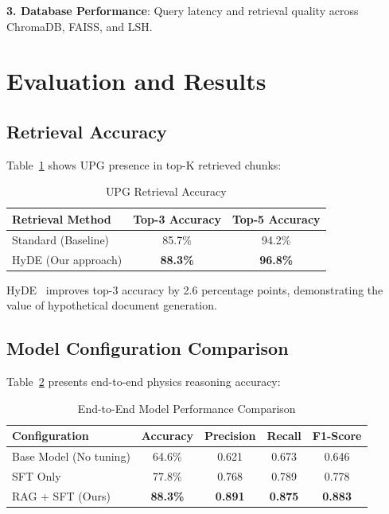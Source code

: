 \documentclass[11pt,a4paper]{article}
\begin{document}
\textbf{3. Database Performance}: Query latency and retrieval quality across ChromaDB, FAISS, and LSH.

\section{Evaluation and Results}

\subsection{Retrieval Accuracy}

Table~\ref{tab:retrieval_accuracy} shows UPG presence in top-K retrieved chunks:

\begin{table}[H]
\centering
\begin{tabular}{lcc}
\toprule
\textbf{Retrieval Method} & \textbf{Top-3 Accuracy} & \textbf{Top-5 Accuracy} \\
\midrule
Standard (Baseline) & 85.7\% & 94.2\% \\
HyDE (Our approach) & \textbf{88.3\%} & \textbf{96.8\%} \\
\bottomrule
\end{tabular}
\caption{UPG Retrieval Accuracy}
\label{tab:retrieval_accuracy}
\end{table}

HyDE~\cite{gao2022precise} improves top-3 accuracy by 2.6 percentage points, demonstrating the value of hypothetical document generation.

\subsection{Model Configuration Comparison}

Table~\ref{tab:model_comparison} presents end-to-end physics reasoning accuracy:

\begin{table}[H]
\centering
\begin{tabular}{lcccc}
\toprule
\textbf{Configuration} & \textbf{Accuracy} & \textbf{Precision} & \textbf{Recall} & \textbf{F1-Score} \\
\midrule
Base Model (No tuning) & 64.6\% & 0.621 & 0.673 & 0.646 \\
SFT Only & 77.8\% & 0.768 & 0.789 & 0.778 \\
RAG + SFT (Ours) & \textbf{88.3\%} & \textbf{0.891} & \textbf{0.875} & \textbf{0.883} \\
\bottomrule
\end{tabular}
\caption{End-to-End Model Performance Comparison}
\label{tab:model_comparison}
\end{table}
\end{document}

